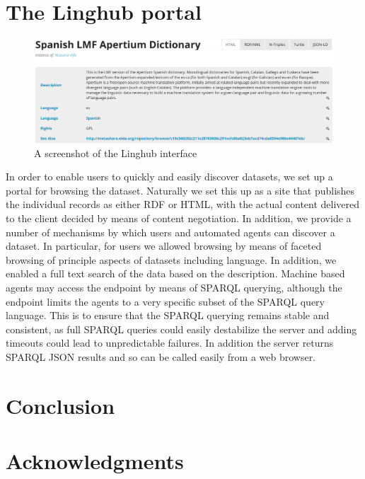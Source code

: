 \documentclass[11pt]{article}
\begin{document}
\section{The Linghub portal}

\begin{figure}
\includegraphics[width=.9\textwidth]{linghub-screenshot.png}
\caption{A screenshot of the Linghub interface\label{fig:screenshot}}
\end{figure}

In order to enable users to quickly and easily discover datasets, we set up a 
portal for browsing the dataset. Naturally we set this up as a site that publishes
the individual records as either RDF or HTML, with the actual content delivered
to the client decided by means of content negotiation. In addition, we provide a 
number of mechanisms by which users and automated agents can discover a dataset. 
In particular, for users we allowed browsing by means of faceted browsing of 
principle aspects of datasets including language. In addition, we enabled a full
text search of the data based on the description. Machine based agents may access
the endpoint by means of SPARQL querying, although the endpoint limits the agents
to a very specific subset of the SPARQL query language. This is to ensure that 
the SPARQL querying remains stable and consistent, as full SPARQL queries could
easily destabilize the server and adding timeouts could lead to unpredictable
failures. In addition the server returns SPARQL JSON results and so can be called
easily from a web browser.


\section{Conclusion}


\section*{Acknowledgments}

%



\end{document}
